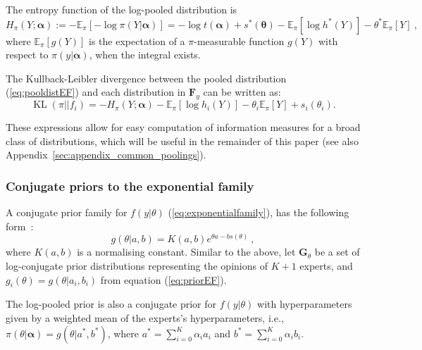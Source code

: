 \documentclass[12pt]{article}
\begin{document}
The entropy function of the log-pooled distribution is
\begin{equation}
\label{eq:entropydistEF}
H_\pi(Y; \boldsymbol\alpha) :=  - \mathbb{E}_{\pi}\left[-\log \pi(Y | \boldsymbol\alpha) \right] = -\log t(\boldsymbol\alpha) + s^\ast (\boldsymbol\theta) - \mathbb{E}_\pi[\log h^\ast (Y)] - \theta^\ast \mathbb{E}_\pi[Y] \: ,
\end{equation}
where $\mathbb{E}_{\pi}\left[ g(Y) \right]$ is the expectation of a $\pi$-measurable function $g(Y)$ with respect to $\pi( y | \boldsymbol\alpha)$, when the integral exists.

The Kullback-Leibler divergence between the pooled distribution (\ref{eq:pooldistEF}) and each distribution in $\mathbf{F}_{y}$ can be written as:
\begin{equation}
\label{eq:KLdistEF}
\operatorname{KL}(\pi || f_i )  =  - H_\pi(Y; \boldsymbol\alpha) - \mathbb{E}_\pi[\log h_i(Y)] - \theta_i \mathbb{E}_\pi[Y] + s_i(\theta_i).
\end{equation}

These expressions allow for easy computation of information measures for a broad class of distributions, which will be useful in the remainder of this paper (see also Appendix~\ref{sec:appendix_common_poolings}).

\subsubsection{Conjugate priors to the exponential family}
\label{sec:conjugexpofamily}

A conjugate prior family for $f(y|\theta)$ (\ref{eq:exponentialfamily}), has the following form~\parencite{Diaconis1979}:
\begin{equation}
\label{eq:priorEF}
g(\theta | a, b) = K(a,b) e^{\theta a - b s(\theta)} \: ,
\end{equation}
where $K(a,b)$ is a normalising constant.
Similar to the above, let $\mathbf{G}_{\theta}$ be a set of log-conjugate prior distributions representing the opinions of $K+1$ experts, and $g_i(\theta) = g(\theta | a_i, b_i)$ from equation (\ref{eq:priorEF}).

The log-pooled prior is also a conjugate prior for $f(y|\theta)$ with hyperparameters given by a weighted mean of the experts's hyperparameters, i.e., $\pi(\theta|\boldsymbol\alpha) = g(\theta | a^*, b^* )$, where $a^* = \sum_{i=0}^K \alpha_i a_i$ and $b^* = \sum_{i=0}^K \alpha_i b_i$.
\end{document}
